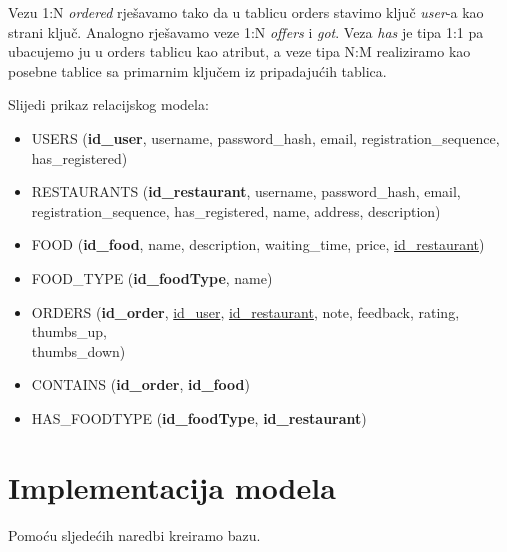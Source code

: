 \documentclass[12pt]{scrartcl}
\begin{document}
Vezu 1:N \emph{ordered} rješavamo tako da u tablicu \textsf{orders} stavimo ključ \emph{user}-a kao strani ključ. Analogno rješavamo veze 1:N \emph{offers} i \emph{got}. Veza \emph{has} je tipa 1:1 pa ubacujemo ju u orders tablicu kao atribut, a veze tipa N:M realiziramo kao posebne tablice sa primarnim ključem iz pripadajućih tablica.

Slijedi prikaz relacijskog modela:

\begin{itemize}
    \item[] \textsf{USERS (\textbf{id\_user}, username, password\_hash, email, registration\_sequence, \\has\_registered)}
    \item[] \textsf{RESTAURANTS (\textbf{id\_restaurant}, username, password\_hash, email, \\registration\_sequence, has\_registered, name, address, description)}
    \item[] \textsf{FOOD (\textbf{id\_food}, name, description, waiting\_time, price, \underline{id\_restaurant})}
    \item[] \textsf{FOOD\_TYPE (\textbf{id\_foodType}, name)}
    \item[] \textsf{ORDERS (\textbf{id\_order}, \underline{id\_user}, \underline{id\_restaurant}, note, feedback, rating, thumbs\_up,\\ thumbs\_down)}
    \item[] \textsf{CONTAINS (\textbf{id\_order}, \textbf{id\_food})}
    \item[] \textsf{HAS\_FOODTYPE (\textbf{id\_foodType}, \textbf{id\_restaurant})}
\end{itemize}

\pagebreak[3]
\section{Implementacija modela}

Pomoću sljedećih naredbi kreiramo bazu.
\end{document}
